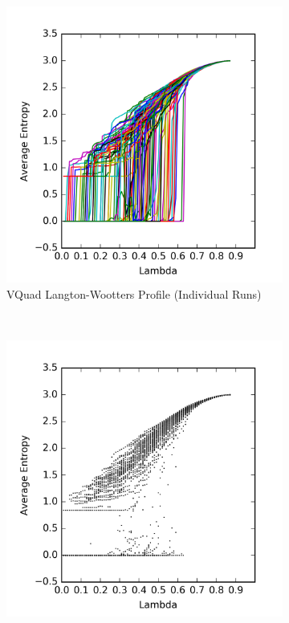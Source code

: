 \documentclass[a4paper,11pt,twoside]{report}
\begin{document}
\begin{figure}[htp]
\centering
\begin{subfigure}[t]{0.6\textwidth}
  \includegraphics[width=\textwidth]{ch6_figs/vor_entropy}
  \caption{VQuad Langton-Wootters Profile (Individual Runs)}
  \label{fig:vor_lw_run}
\end{subfigure}
~
\begin{subfigure}[t]{0.6\textwidth}
  \centering
  \includegraphics[width=\textwidth]{ch6_figs/vor_entropy_scatter}

\end{subfigure}
\end{figure}
\end{document}
